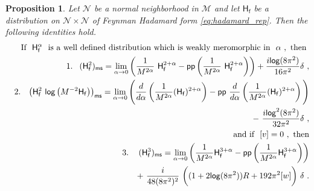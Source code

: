 \documentclass[11pt]{book}
\newcommand{\pp}{\mathsf{pp}}
\newcommand{\ms}{\mathsf{ms}}
\renewcommand{\log}{\mathsf{log}}
\newcommand{\Mcal}{\mathcal{M}}
\newcommand{\Ncal}{\mathcal{N}}
\newcommand{\Hsf}{\mathsf{H}}
\newcommand{\fsf}{\mathsf{f}}
\theoremstyle{break}
\newtheorem{proposition}{Proposition}[chapter]
\begin{document}
\begin{proposition}\label{prop:equivalent_scheme}
Let $\Ncal$ be a normal neighborhood in $\Mcal$ and let $\Hsf_\fsf$ be a distribution on $\Ncal \times \Ncal$ of Feynman Hadamard form \eqref{eq:hadamard_rep}. Then the following identities hold.
%
%
\begin{eqnarray}
%
&& \hspace*{-18pt} \mbox{If } \ \Hsf_\fsf^{\alpha} \ \mbox{ is a well defined distribution which is weakly meromorphic in } \ \alpha \ , \mbox{ then } \nonumber \\
%
&& 1. \hspace*{8pt} (\Hsf_\fsf^2)_\ms = \lim_{\alpha\to 0} \left( \frac{1}{M^{2\alpha}} \ \Hsf_\fsf^{2+\alpha} - \pp\left(\frac{1}{M^{2\alpha}} \ \Hsf_\fsf^{2+\alpha} \right) \right) + \frac{i\log(8\pi^2)}{16\pi^2} \delta \ , \label{eq:item_1} \\
%
&& 2. \hspace*{8pt} \left(\Hsf_\fsf^2 \ \log \left(M^{-2}\Hsf_\fsf\right)\right)_\ms = \lim_{\alpha\to 0} \Bigg(\frac{d}{d\alpha}\left(\frac{1}{M^{2\alpha}}(\Hsf_\fsf)^{2+\alpha}\right) - \pp \ \frac{d}{d\alpha}\left(\frac{1}{M^{2\alpha}}(\Hsf_\fsf)^{2+\alpha}\right)\Bigg) \nonumber \\
&& \hspace*{145pt} - \ \frac{i\log^2(8\pi^2)}{32\pi^2}\delta \ , \label{eq:item_2} \\
%
&& \hspace*{-18pt} \mbox{ and if } \ [v]=0 \ , \ \mbox{then} \nonumber \\
%
&& 3. \hspace*{12pt} (\Hsf_\fsf^3)_\ms = \lim_{\alpha\to 0}\left(\frac{1}{M^{2\alpha}} \Hsf_\fsf^{3+\alpha} - \pp\left(\frac{1}{M^{2\alpha}} \Hsf_\fsf^{3+\alpha} \right)\right) \nonumber \\
&& \hspace*{70pt} + \ \frac{i}{48(8\pi^2)^2} \ \bigg((1+2\log(8\pi^2))R+192\pi^2[w]\bigg) \ \delta \ .
\label{eq:item_3}
%
\end{eqnarray}
%
\end{proposition}
\end{document}
